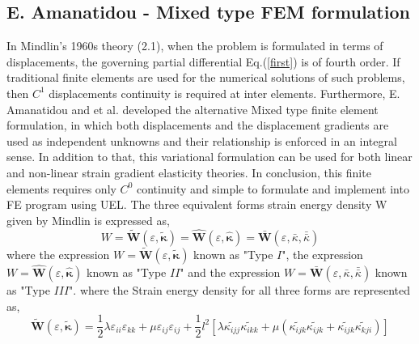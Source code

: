 \documentclass[12pt]{article}
\begin{document}
\subsection{E. Amanatidou - Mixed type FEM formulation}
In Mindlin's 1960s theory (2.1), when the problem is formulated in terms of displacements, the governing partial differential Eq.(\ref{first}) is of fourth order. If traditional finite elements are used for the numerical solutions of such problems, then $C^1$ displacements continuity is required at inter elements.
\newline
\newline
Furthermore, E. Amanatidou \cite{amanatidou2002mixed} and et al. developed the alternative Mixed type finite element formulation, in which both displacements and the displacement gradients are used as independent unknowns and their relationship is enforced in an integral sense. In addition to that, this variational formulation can be used for both linear and non-linear strain gradient elasticity theories. In conclusion, this finite elements requires only $C^0$ continuity and simple to formulate and implement into FE program using UEL.   
\newline
\newline
The three equivalent forms strain energy density W given by Mindlin is expressed as,
\begin{equation}
W = \tilde{\mathbf{W}}(\varepsilon,\tilde{\mathbf{\kappa}}) = \hat{\mathbf{W}}(\varepsilon,\hat{\mathbf{\kappa}}) = \bar{\mathbf{W}}(\varepsilon,\bar{\kappa},\bar{\bar \kappa})
\end{equation}
\newline
where the expression $W = \tilde{\mathbf{W}}(\varepsilon,\tilde{\mathbf{\kappa}})$ known as "Type $I$", the expression $W =\hat{\mathbf{W}}(\varepsilon,\hat{\mathbf{\kappa}}) $ known as "Type $II$" and the expression $W = \bar{\mathbf{W}}(\varepsilon,\bar{\kappa},\bar{\bar \kappa}) $ known as "Type $III$".
\newline
\newline
where the Strain energy density for all three forms are represented as,
\newline
\newline
\begin{equation}\label{eleven}
\tilde{\mathbf{W}}(\varepsilon,\tilde{\mathbf{\kappa}}) = \dfrac{1}{2}\lambda\varepsilon_{ii}\varepsilon_{kk} + \mu\varepsilon_{ij}\varepsilon_{ij}+\frac{1}{2}l^2[\lambda\tilde{\kappa_{ijj}}\tilde{\kappa_{ikk}} + \mu(\tilde{\kappa_{ijk}}\tilde{\kappa_{ijk}}+\tilde{\kappa_{ijk}}\tilde{\kappa_{kji}})]
\end{equation}
\end{document}
